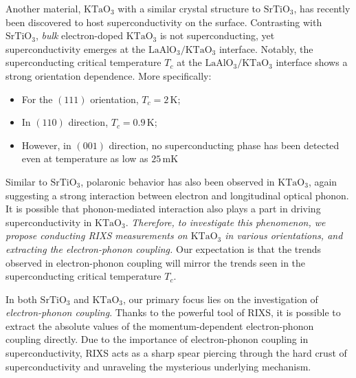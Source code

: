 \documentclass[11pt]{article}
\begin{document}
Another material, $\mathrm{KTaO_{3}}$ with a similar crystal structure to $\mathrm{SrTiO_{3}}$, has recently been discovered to host superconductivity on the surface\cite{ren_two-dimensional_2022}. Contrasting with $\mathrm{SrTiO_{3}}$, \textit{bulk}  electron-doped $\mathrm{KTaO_{3}}$ is not superconducting, yet superconductivity emerges at the $\mathrm{LaAlO_{3}/KTaO_{3}}$ interface\cite{ren_two-dimensional_2022,chen_two-dimensional_2021}. Notably, the superconducting critical temperature $T_c$ at the $\mathrm{LaAlO_{3}/KTaO_{3}}$ interface shows a strong orientation dependence\cite{ren_two-dimensional_2022,chen_two-dimensional_2021}. More specifically: 
\begin{itemize}
\item For the $(111)$ orientation, $T_{c} = 2\,\mathrm{K}$\cite{ren_two-dimensional_2022};
\item In $(110)$ direction, $T_{c} = 0.9\,\mathrm{K}$\cite{chen_two-dimensional_2021};
\item However, in $(001)$ direction, no superconducting phase has been detected even at temperature as low as $25\,\mathrm{mK}$\cite{ren_two-dimensional_2022} 
\end{itemize}
Similar to $\mathrm{SrTiO_{3}}$\cite{swartz_polaronic_2018}, polaronic behavior has also been observed in $\mathrm{KTaO_{3}}$, again suggesting a strong interaction between electron and longitudinal optical phonon\cite{chen_orientation-dependent_2023}. It is possible that phonon-mediated interaction also plays a part in driving superconductivity in $\mathrm{KTaO_{3}}$. \textit{Therefore, to investigate this phenomenon, we propose conducting RIXS measurements on $\mathrm{KTaO_{3}}$ in various orientations, and extracting the electron-phonon coupling.} Our expectation is that the trends observed in electron-phonon coupling will mirror the trends seen in the superconducting critical temperature $T_c$. 

In both $\mathrm{SrTiO_{3}}$ and $\mathrm{KTaO_{3}}$, our primary focus lies on the investigation of \textit{electron-phonon coupling}. Thanks to the powerful tool of RIXS, it is possible to extract the absolute values of the momentum-dependent electron-phonon coupling directly. Due to the importance of electron-phonon coupling in superconductivity, RIXS acts as a sharp spear piercing through the hard crust of superconductivity and unraveling the mysterious underlying mechanism. 
\end{document}
